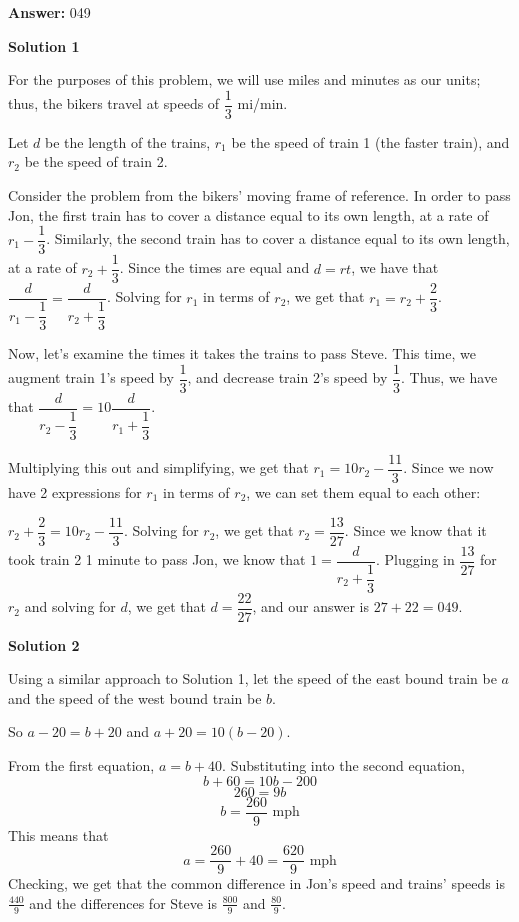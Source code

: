 \begin{enumerate}
 
 \textbf{Answer: }049



\textbf{Solution 1}

For the purposes of this problem, we will use miles and minutes as our units; thus, the bikers travel at speeds of $\dfrac{1}{3}$ mi/min.

 Let $d$ be the length of the trains, $r_1$ be the speed of train 1 (the faster train), and $r_2$ be the speed of train 2.

 Consider the problem from the bikers' moving frame of reference. In order to pass Jon, the first train has to cover a distance equal to its own length, at a rate of $r_1 - \dfrac{1}{3}$. Similarly, the second train has to cover a distance equal to its own length, at a rate of $r_2 + \dfrac{1}{3}$. Since the times are equal and $d = rt$, we have that $\dfrac{d}{r_1 - \dfrac{1}{3}} = \dfrac{d}{r_2 + \dfrac{1}{3}}$. Solving for $r_1$ in terms of $r_2$, we get that $r_1 = r_2 + \dfrac{2}{3}$.

 Now, let's examine the times it takes the trains to pass Steve. This time, we augment train 1's speed by $\dfrac{1}{3}$, and decrease train 2's speed by $\dfrac{1}{3}$. Thus, we have that $\dfrac{d}{r_2 - \dfrac{1}{3}} = 10\dfrac{d}{r_1 + \dfrac{1}{3}}$.

 Multiplying this out and simplifying, we get that $r_1 = 10r_2 - \dfrac{11}{3}$. Since we now have 2 expressions for $r_1$ in terms of $r_2$, we can set them equal to each other:

 $r_2 + \dfrac{2}{3} = 10r_2 - \dfrac{11}{3}$. Solving for $r_2$, we get that $r_2 = \dfrac{13}{27}$. Since we know that it took train 2 1 minute to pass Jon, we know that $1 = \dfrac{d}{r_2 + \dfrac{1}{3}}$. Plugging in $\dfrac{13}{27}$ for $r_2$ and solving for $d$, we get that $d = \dfrac{22}{27}$, and our answer is $27 + 22 = \boxed{049}$.

 



\textbf{Solution 2}

Using a similar approach to Solution 1, let the speed of the east bound train be $a$ and the speed of the west bound train be $b$.

 So $a-20=b+20$ and $a+20=10(b-20)$.

 From the first equation, $a=b+40$. Substituting into the second equation,
 \[b+60=10b-200\]
 \[260=9b\]
 \[b=\frac{260}{9}\text{ mph}\]This means that 
 \[a=\frac{260}{9}+40=\frac{620}{9}\text{ mph}\]Checking, we get that the common difference in Jon's speed and trains' speeds is $\frac{440}{9}$ and the differences for Steve is $\frac{800}{9}$ and $\frac{80}{9}$.


\end{enumerate}
